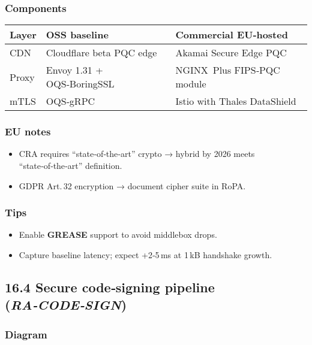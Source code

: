\documentclass[
  english,
]{article}
\providecommand{\tightlist}{%
  \setlength{\itemsep}{0pt}\setlength{\parskip}{0pt}}
\begin{document}
\subsubsection{Components}\label{components-1}

\begin{longtable}[]{@{}lll@{}}
\toprule\noalign{}
Layer & OSS baseline & Commercial EU‑hosted \\
\midrule\noalign{}
\endhead
\bottomrule\noalign{}
\endlastfoot
CDN & Cloudflare beta PQC edge & Akamai Secure Edge PQC \\
Proxy & Envoy 1.31 + OQS‑BoringSSL & NGINX~Plus FIPS‑PQC module \\
mTLS & OQS‑gRPC & Istio with Thales DataShield \\
\end{longtable}

\subsubsection{EU notes}\label{eu-notes}

\begin{itemize}
\tightlist
\item
  CRA requires ``state‑of‑the‑art'' crypto → hybrid by 2026 meets
  ``state‑of‑the‑art'' definition.
\item
  GDPR Art.\,32 encryption → document cipher suite in RoPA.
\end{itemize}

\subsubsection{Tips}\label{tips}

\begin{itemize}
\tightlist
\item
  Enable \textbf{GREASE} support to avoid middlebox drops.
\item
  Capture baseline latency; expect +2‑5\,ms at 1\,kB handshake growth.
\end{itemize}

\subsection{\texorpdfstring{16.4 Secure code‑signing pipeline
(\emph{RA‑CODE‑SIGN})}{16.4 Secure code‑signing pipeline (RA‑CODE‑SIGN)}}\label{secure-codesigning-pipeline-racodesign}

\subsubsection{Diagram}\label{diagram-2}
\end{document}
